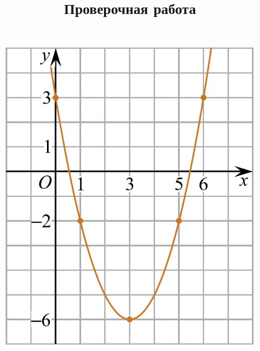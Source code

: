 \begin{listofex}
\begin{minipage}[c]{0.3\textwidth}
		\includegraphics[align=t, width=\textwidth]{pics/G113M3C7-1}
	\end{minipage}
\end{listofex}
\newpage
\title{Проверочная работа}
